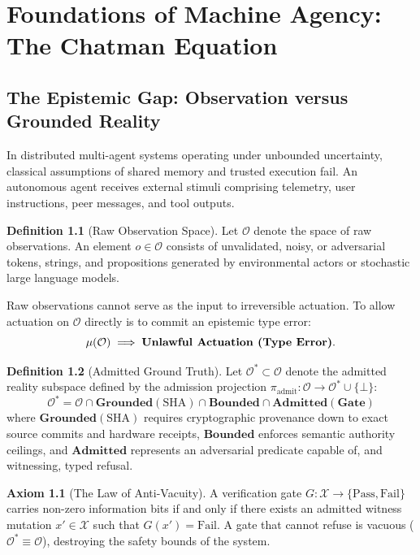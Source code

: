 \documentclass[11pt,twoside,openright]{report}
\theoremstyle{definition}
\newtheorem{definition}{Definition}[chapter]
\newtheorem{axiom}{Axiom}[chapter]
\theoremstyle{plain}
\theoremstyle{remark}
\begin{document}
\tableofcontents

\chapter{Foundations of Machine Agency: The Chatman Equation}
\label{ch:chatman}

\section{The Epistemic Gap: Observation versus Grounded Reality}
In distributed multi-agent systems operating under unbounded uncertainty, classical assumptions of shared memory and trusted execution fail. An autonomous agent receives external stimuli comprising telemetry, user instructions, peer messages, and tool outputs.

\begin{definition}[Raw Observation Space]
Let $\mathcal{O}$ denote the space of raw observations. An element $o \in \mathcal{O}$ consists of unvalidated, noisy, or adversarial tokens, strings, and propositions generated by environmental actors or stochastic large language models.
\end{definition}

Raw observations cannot serve as the input to irreversible actuation. To allow actuation on $\mathcal{O}$ directly is to commit an epistemic type error:
\[
\mu(\mathcal{O}) \implies \text{\textbf{Unlawful Actuation (Type Error)}}.
\]

\begin{definition}[Admitted Ground Truth]
Let $\mathcal{O}^* \subset \mathcal{O}$ denote the admitted reality subspace defined by the admission projection $\pi_{\mathrm{admit}}: \mathcal{O} \to \mathcal{O}^* \cup \{\bot\}$:
\[
\mathcal{O}^* = \mathcal{O} \cap \mathbf{Grounded}(\mathrm{SHA}) \cap \mathbf{Bounded} \cap \mathbf{Admitted}(\mathbf{Gate})
\]
where $\mathbf{Grounded}(\mathrm{SHA})$ requires cryptographic provenance down to exact source commits and hardware receipts, $\mathbf{Bounded}$ enforces semantic authority ceilings, and $\mathbf{Admitted}$ represents an adversarial predicate capable of, and witnessing, typed refusal.
\end{definition}

\begin{axiom}[The Law of Anti-Vacuity]
A verification gate $G: \mathcal{X} \to \{\mathrm{Pass}, \mathrm{Fail}\}$ carries non-zero information bits if and only if there exists an admitted witness mutation $x' \in \mathcal{X}$ such that $G(x') = \mathrm{Fail}$. A gate that cannot refuse is vacuous ($\mathcal{O}^* \equiv \mathcal{O}$), destroying the safety bounds of the system.
\end{axiom}
\end{document}
